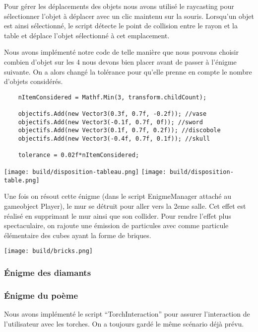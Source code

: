 \documentclass[12pt]{article}
\begin{document}
Pour gérer les déplacements des objets nous avons utilisé le raycasting pour sélectionner l’objet à déplacer avec un clic maintenu sur la souris. Lorsqu’un objet est ainsi sélectionné, le script détecte le point de collision entre le rayon et la table et déplace l’objet sélectionné à cet emplacement.

Nous avons implémenté notre code de telle manière que nous pouvons choisir combien d'objet sur les 4 nous devons bien placer avant de passer à l'énigme suivante. On a alors changé la tolérance pour qu'elle prenne en compte le nombre d'objets considérés.

\begin{verbatim}
    nItemConsidered = Mathf.Min(3, transform.childCount);

    objectifs.Add(new Vector3(0.3f, 0.7f, -0.2f)); //vase
    objectifs.Add(new Vector3(-0.1f, 0.7f, 0f)); //sword
    objectifs.Add(new Vector3(0.1f, 0.7f, 0.2f)); //discobole
    objectifs.Add(new Vector3(-0.4f, 0.7f, 0.1f)); //skull

    tolerance = 0.02f*nItemConsidered;
\end{verbatim}

\begin{center}
    \texttt{[image: build/disposition-tableau.png]}
    \texttt{[image: build/disposition-table.png]}
\end{center}

Une fois on résout cette énigme (dans le script EnigmeManager attaché au gameobject Player), le mur se détruit pour aller vers la 2eme salle. Cet effet est réalisé en supprimant le mur ainsi que son collider. Pour rendre l'effet plus spectaculaire, on rajoute une émission de particules avec comme particule élémentaire des cubes ayant la forme de briques.

\begin{center}
    \texttt{[image: build/bricks.png]}
\end{center}
\subsubsection{Énigme des diamants}
\subsubsection{Énigme du poème}
Nous avons implémenté le script “TorchInteraction” pour assurer l’interaction de l’utilisateur avec les torches. On a toujours gardé le même scénario déjà prévu.
\end{document}
